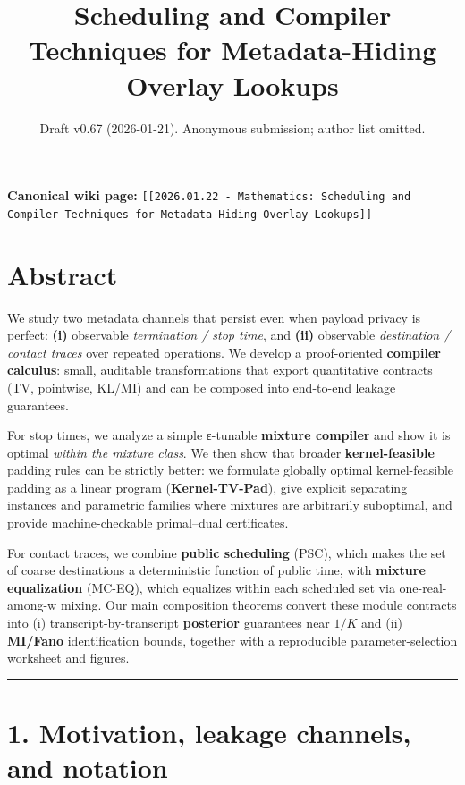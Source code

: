 \documentclass[11pt]{article}
\title{Scheduling and Compiler Techniques for Metadata-Hiding Overlay Lookups}
\author{}
\date{Draft v0.67 (2026-01-21). Anonymous submission; author list
omitted.}
\begin{document}
\maketitle

\noindent\textbf{Canonical wiki page:} \texttt{[[2026.01.22 - Mathematics: Scheduling and Compiler Techniques for Metadata-Hiding Overlay Lookups]]}\\


\hypertarget{abstract}{%
\section{Abstract}\label{abstract}}

We study two metadata channels that persist even when payload privacy is
perfect: \textbf{(i)} observable \emph{termination / stop time}, and
\textbf{(ii)} observable \emph{destination / contact traces} over
repeated operations. We develop a proof-oriented \textbf{compiler
calculus}: small, auditable transformations that export quantitative
contracts (TV, pointwise, KL/MI) and can be composed into end-to-end
leakage guarantees.

For stop times, we analyze a simple ε-tunable \textbf{mixture compiler}
and show it is optimal \emph{within the mixture class}. We then show
that broader \textbf{kernel-feasible} padding rules can be strictly
better: we formulate globally optimal kernel-feasible padding as a
linear program (\textbf{Kernel-TV-Pad}), give explicit separating
instances and parametric families where mixtures are arbitrarily
suboptimal, and provide machine-checkable primal--dual certificates.

For contact traces, we combine \textbf{public scheduling} (PSC), which
makes the set of coarse destinations a deterministic function of public
time, with \textbf{mixture equalization} (MC-EQ), which equalizes within
each scheduled set via one-real-among-w mixing. Our main composition
theorems convert these module contracts into (i)
transcript-by-transcript \textbf{posterior} guarantees near \(1/K\) and
(ii) \textbf{MI/Fano} identification bounds, together with a
reproducible parameter-selection worksheet and figures.

\begin{center}\rule{0.5\linewidth}{0.5pt}\end{center}

\hypertarget{motivation-leakage-channels-and-notation}{%
\section{1. Motivation, leakage channels, and
notation}\label{motivation-leakage-channels-and-notation}}
\end{document}
